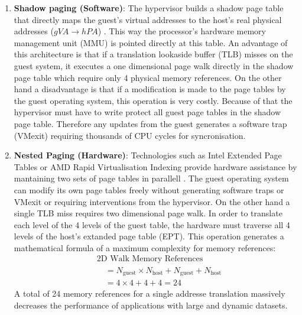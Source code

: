     \begin{enumerate}
        \item \textbf{Shadow paging (Software)}: The hypervisor builds a shadow page table that directly maps the guest's virtual addresses to the host's real physical addresses ($gVA \rightarrow hPA$) \cite{agile-paging}. This way the processor's hardware memory management unit (MMU) is pointed directly at this table. An advantage of this architecture is that if a translation lookaside buffer (TLB) misses on the guest system, it executes a one dimensional page walk directly in the shadow page table which require only 4 physical memory references. On the other hand a disadvantage is that if a modification is made to the page tables by the guest operating system, this operation is very costly. Because of that the hypervisor must have to write protect all guest page tables in the shadow page table. Therefore any updates from the guest generates a software trap (VMexit) requiring thousands of CPU cycles for syncronisation.
        \item \textbf{Nested Paging (Hardware)}: Technologies such as Intel Extended Page Tables or AMD Rapid Virtualisation Indexing provide hardware assistance by mantaining two sets of page tables in parallell \cite{agile-paging}. The guest operating system can modify its own page tables freely without generating software traps or VMexit or requiring interventions from the hypervisor. On the other hand a single TLB miss requires two dimensional page walk. In order to translate each level of the 4 levels of the guest table, the hardware must traverse all 4 levels of the host's extanded page table (EPT). This operation generates a mathematical formula of a maximum complexity for memory references:
        \begin{equation} \label{eq:2dwalk}
        \begin{split}
        &\text{2D Walk Memory References} \\
        &\quad = N_{\text{guest}} \times N_{\text{host}} + N_{\text{guest}} + N_{\text{host}} \\
        &\quad = 4 \times 4 + 4 + 4 = 24
        \end{split}
        \end{equation}
        A total of 24 memory references  for a single addresse translation massively decreases the performance of applications with large and dynamic datasets. 
    \end{enumerate}

